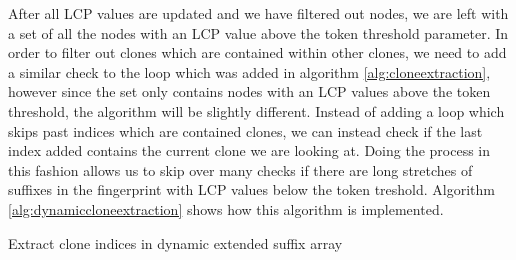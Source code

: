 After all LCP values are updated and we have filtered out nodes, we are left with a set of
all the nodes with an LCP value above the token threshold parameter. In order to filter
out clones which are contained within other clones, we need to add a similar check to the
loop which was added in algorithm \ref{alg:cloneextraction}, however since the set only
contains nodes with an LCP values above the token threshold, the algorithm will be
slightly different. Instead of adding a loop which skips past indices which are contained
clones, we can instead check if the last index added contains the current clone we are
looking at. Doing the process in this fashion allows us to skip over many checks if there
are long stretches of suffixes in the fingerprint with LCP values below the token
treshold. Algorithm \ref{alg:dynamiccloneextraction} shows how this algorithm is
implemented.

\begin{algorithm}[t]
  \SetAlgoLined\DontPrintSemicolon

  \vspace{0.5cm}
  \caption{Extract clone indices in dynamic extended suffix array}
  \label{alg:dynamiccloneextraction}
\end{algorithm}

